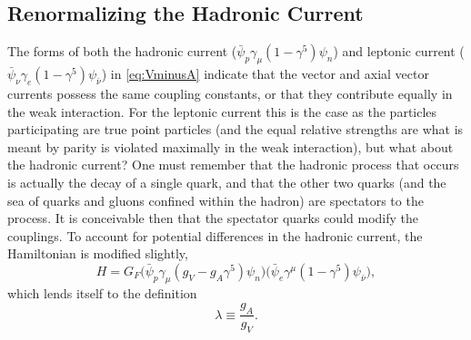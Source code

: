 
\subsection{Renormalizing the Hadronic Current}

The forms of both the hadronic current ($\bar{\psi}_p \gamma_\mu(1-\gamma^5)\psi_n$) and
leptonic current ($\bar{\psi}_\nu \gamma_e(1-\gamma^5)\psi_{\bar{\nu}}$) in \ref{eq:VminusA} indicate
that the vector and axial vector currents possess the same coupling constants, or that
they contribute equally in the weak interaction. For the leptonic current this is the case
as the particles participating are true point particles (and the equal relative strengths are
what is meant by parity is violated maximally in the weak interaction), but what about the
hadronic current? One must remember that the hadronic process that occurs is actually the decay
of a single quark, and that the other two quarks (and the sea of quarks and gluons confined within the hadron)
are spectators to the process.
It is conceivable then that the spectator quarks could modify the couplings.
To account for potential differences in the hadronic current, the
Hamiltonian is modified slightly,
%
\begin{equation} 
  H = G_F \Big(\bar{\psi}_p \gamma_\mu(g_V-g_A\gamma^5)\psi_n \Big)\Big(\bar{\psi}_{e} \gamma^\mu(1-\gamma^5)\psi_{\bar{\nu}} \Big),
  \label{eq:VminusA2}
\end{equation}
%
which lends itself to the definition
%
\begin{equation}
  \lambda \equiv \frac{g_A}{g_V}.
\end{equation}

